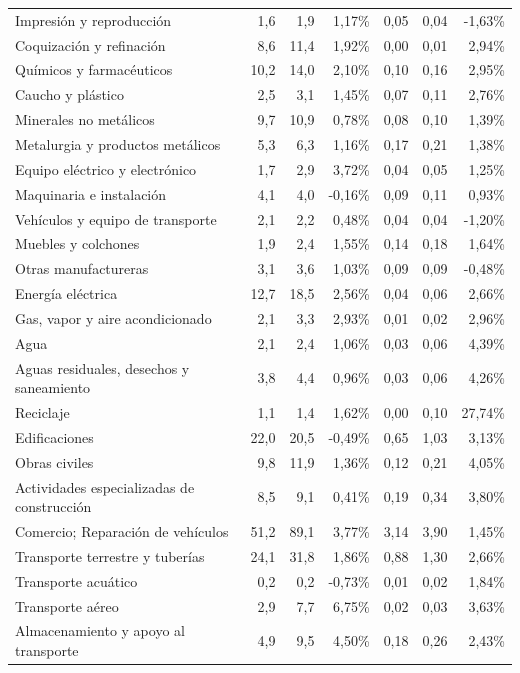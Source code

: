 \begin{longtable}{p{}rrrrrr}
Impresión y reproducción & 1,6 & 1,9 & 1,17\% & 0,05 & 0,04 & -1,63\% \\
Coquización y refinación & 8,6 & 11,4 & 1,92\% & 0,00 & 0,01 & 2,94\% \\
Químicos y farmacéuticos & 10,2 & 14,0 & 2,10\% & 0,10 & 0,16 & 2,95\% \\
Caucho y plástico & 2,5 & 3,1 & 1,45\% & 0,07 & 0,11 & 2,76\% \\
Minerales no metálicos & 9,7 & 10,9 & 0,78\% & 0,08 & 0,10 & 1,39\% \\
Metalurgia y productos metálicos & 5,3 & 6,3 & 1,16\% & 0,17 & 0,21 & 1,38\% \\
Equipo eléctrico y electrónico & 1,7 & 2,9 & 3,72\% & 0,04 & 0,05 & 1,25\% \\
Maquinaria e instalación & 4,1 & 4,0 & -0,16\% & 0,09 & 0,11 & 0,93\% \\
Vehículos y equipo de transporte & 2,1 & 2,2 & 0,48\% & 0,04 & 0,04 & -1,20\% \\
Muebles y colchones & 1,9 & 2,4 & 1,55\% & 0,14 & 0,18 & 1,64\% \\
Otras manufactureras & 3,1 & 3,6 & 1,03\% & 0,09 & 0,09 & -0,48\% \\
Energía eléctrica & 12,7 & 18,5 & 2,56\% & 0,04 & 0,06 & 2,66\% \\
Gas, vapor y aire acondicionado & 2,1 & 3,3 & 2,93\% & 0,01 & 0,02 & 2,96\% \\
Agua & 2,1 & 2,4 & 1,06\% & 0,03 & 0,06 & 4,39\% \\
Aguas residuales, desechos y saneamiento & 3,8 & 4,4 & 0,96\% & 0,03 & 0,06 & 4,26\% \\
Reciclaje & 1,1 & 1,4 & 1,62\% & 0,00 & 0,10 & 27,74\% \\
Edificaciones & 22,0 & 20,5 & -0,49\% & 0,65 & 1,03 & 3,13\% \\
Obras civiles & 9,8 & 11,9 & 1,36\% & 0,12 & 0,21 & 4,05\% \\
Actividades especializadas de construcción & 8,5 & 9,1 & 0,41\% & 0,19 & 0,34 & 3,80\% \\
Comercio; Reparación de vehículos & 51,2 & 89,1 & 3,77\% & 3,14 & 3,90 & 1,45\% \\
Transporte terrestre y tuberías & 24,1 & 31,8 & 1,86\% & 0,88 & 1,30 & 2,66\% \\
Transporte acuático & 0,2 & 0,2 & -0,73\% & 0,01 & 0,02 & 1,84\% \\
Transporte aéreo & 2,9 & 7,7 & 6,75\% & 0,02 & 0,03 & 3,63\% \\
Almacenamiento y apoyo al transporte & 4,9 & 9,5 & 4,50\% & 0,18 & 0,26 & 2,43\% \\

\end{longtable}
